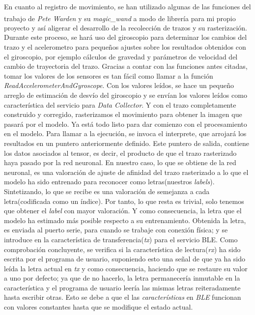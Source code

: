 En cuanto al registro de movimiento, se han utilizado algunas de las funciones
del trabajo de \textit{Pete Warden} y su \textit{magic\_wand}\textsuperscript{\cite{petewardenmw}}
a modo de librería para mi propio proyecto y así aligerar el desarrollo de
la recolección de trazos y su rasterización.\newline
Durante este proceso, se hará uso del giroscopio para determinar los cambios del trazo y el acelerometro
para pequeños ajustes sobre los resultados obtenidos con el giroscopio, por ejemplo
cálculos de gravedad y parámetros de velocidad del cambio de trayectoria del trazo.
Gracias a contar con las funciones antes citadas, tomar los valores de los sensores
es tan fácil como llamar a la función \textit{ReadAccelerometerAndGyroscope}.
Con los valores leídos, se hace un pequeño arreglo de estimación de desvío del giroscopio
y se envían los valores leídos como característica del servicio para \textit{Data Collector}.\newline
Y con el trazo completamente construido y corregido, rasterizamos el movimiento para
obtener la imagen que pasará por el modelo.\newline
Ya está todo listo para dar comienzo con el procesamiento en el modelo. Para llamar a la ejecución,
se invoca el interprete, que arrojará los resultados en un puntero anteriormente definido.
Este puntero de salida, contiene los datos asociados al tensor, es decir, el producto
de que el trazo rasterizado haya pasado por la red neuronal. En nuestro caso, lo que
se obtiene de la red neuronal, es una valoración de ajuste de afinidad del trazo rasterizado
a lo que el modelo ha sido entrenado para reconocer como letras(nuestros \textit{labels}).\newline
Sintetizando, lo que se recibe es una valoración de semejanza a cada letra(codificada como
un índice).\newline
Por tanto, lo que resta es trivial, solo tenemos que obtener el \textit{label} con mayor valoración.
Y como consecuencia, la letra que el modelo ha estimado más posible respecto a su entrenamiento.\newline
Obtenida la letra, es enviada al puerto serie, para cuando se trabaje con conexión física;
y se introduce en la característica de transferencia(\textit{tx}) para el servicio BLE.\newline
Como comprobación concluyente, se verifica si la característica de lectura(\textit{rx}) ha sido
escrita por el programa de usuario, suponiendo esto una señal de que ya ha sido leída la letra
actual en \textit{tx} y como consecuencia, haciendo que se restaure su valor a uno por defecto;
ya que de no hacerlo, la letra permanecería inmutable en la característica y el programa
de usuario leería las mismas letras reiteradamente hasta escribir otras.
Esto se debe a que el las \textit{características} en \textit{BLE} funcionan con valores
constantes hasta que se modifique el estado actual.
